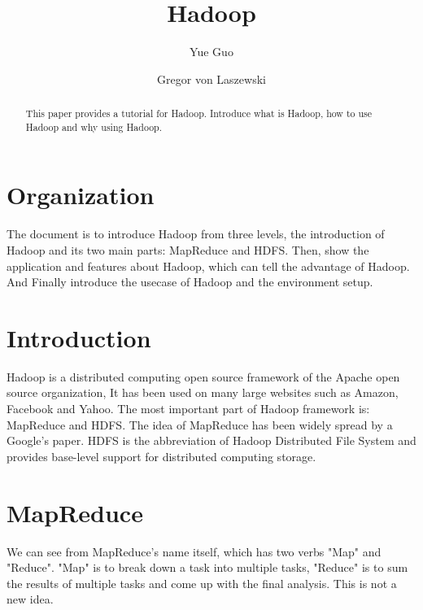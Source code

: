 \title{Hadoop}



\author{Yue Guo}


\author{Gregor von Laszewski}



\begin{abstract}
This paper provides a tutorial for Hadoop. Introduce what is Hadoop, how to use Hadoop and why using Hadoop.
\end{abstract}



\maketitle

\section{Organization}
The document is to introduce Hadoop from three levels, the introduction of Hadoop and its  two main parts: MapReduce and HDFS. Then, show the application and features about Hadoop, which can tell the advantage of Hadoop. And Finally introduce the usecase of Hadoop and the environment setup.

\section{Introduction}
Hadoop is a distributed computing open source framework of the Apache open source organization, It has been used on many large websites such as Amazon, Facebook and Yahoo. The most important part of Hadoop framework is: MapReduce and HDFS. The idea of MapReduce has been widely spread by a Google's paper. HDFS is the abbreviation of Hadoop Distributed File System and provides base-level support for distributed computing storage.


\section{MapReduce}
We can see from MapReduce's name itself, which has two verbs "Map" and "Reduce". "Map" is to break down a task into multiple tasks, "Reduce" is to sum the results of multiple tasks and come up with the final analysis. This is not a new idea. 

